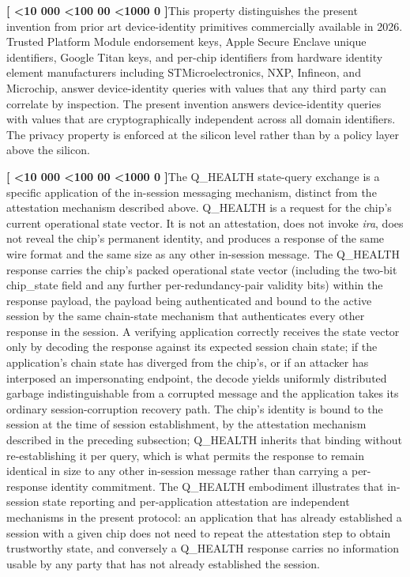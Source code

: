 \documentclass[12pt,letterpaper]{article}
\newcounter{para}
\newcommand{\padzero}{%
  \ifnum\value{para}<10 000\else%
  \ifnum\value{para}<100 00\else%
  \ifnum\value{para}<1000 0\else%
  \fi\fi\fi}
\newcommand{\para}{%
  \refstepcounter{para}\noindent\textbf{[\padzero\arabic{para}]}\hspace{0.5em}\ignorespaces}
\begin{document}
\para This property distinguishes the present invention from prior art device-identity primitives commercially available in 2026. Trusted Platform Module endorsement keys, Apple Secure Enclave unique identifiers, Google Titan keys, and per-chip identifiers from hardware identity element manufacturers including STMicroelectronics, NXP, Infineon, and Microchip, answer device-identity queries with values that any third party can correlate by inspection. The present invention answers device-identity queries with values that are cryptographically independent across all domain identifiers. The privacy property is enforced at the silicon level rather than by a policy layer above the silicon.

\para The Q\_HEALTH state-query exchange is a specific application of the in-session messaging mechanism, distinct from the attestation mechanism described above. Q\_HEALTH is a request for the chip's current operational state vector. It is not an attestation, does not invoke \emph{ira}, does not reveal the chip's permanent identity, and produces a response of the same wire format and the same size as any other in-session message. The Q\_HEALTH response carries the chip's packed operational state vector (including the two-bit chip\_state field and any further per-redundancy-pair validity bits) within the response payload, the payload being authenticated and bound to the active session by the same chain-state mechanism that authenticates every other response in the session. A verifying application correctly receives the state vector only by decoding the response against its expected session chain state; if the application's chain state has diverged from the chip's, or if an attacker has interposed an impersonating endpoint, the decode yields uniformly distributed garbage indistinguishable from a corrupted message and the application takes its ordinary session-corruption recovery path. The chip's identity is bound to the session at the time of session establishment, by the attestation mechanism described in the preceding subsection; Q\_HEALTH inherits that binding without re-establishing it per query, which is what permits the response to remain identical in size to any other in-session message rather than carrying a per-response identity commitment. The Q\_HEALTH embodiment illustrates that in-session state reporting and per-application attestation are independent mechanisms in the present protocol: an application that has already established a session with a given chip does not need to repeat the attestation step to obtain trustworthy state, and conversely a Q\_HEALTH response carries no information usable by any party that has not already established the session.
\end{document}
